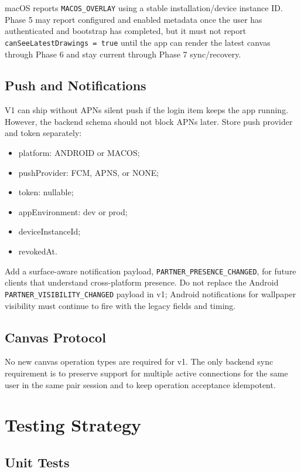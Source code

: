 \documentclass[11pt]{article}
\begin{document}
macOS reports \texttt{MACOS\_OVERLAY} using a stable installation/device instance ID. Phase 5 may report configured and enabled metadata once the user has authenticated and bootstrap has completed, but it must not report {\footnotesize\texttt{canSeeLatestDrawings = true}} until the app can render the latest canvas through Phase 6 and stay current through Phase 7 sync/recovery.

\subsection{Push and Notifications}

V1 can ship without APNs silent push if the login item keeps the app running. However, the backend schema should not block APNs later. Store push provider and token separately:
\begin{itemize}
  \item platform: ANDROID or MACOS;
  \item pushProvider: FCM, APNS, or NONE;
  \item token: nullable;
  \item appEnvironment: dev or prod;
  \item deviceInstanceId;
  \item revokedAt.
\end{itemize}

Add a surface-aware notification payload, {\footnotesize\texttt{PARTNER\_PRESENCE\_CHANGED}}, for future clients that understand cross-platform presence. Do not replace the Android {\footnotesize\texttt{PARTNER\_VISIBILITY\_CHANGED}} payload in v1; Android notifications for wallpaper visibility must continue to fire with the legacy fields and timing.

\subsection{Canvas Protocol}

No new canvas operation types are required for v1. The only backend sync requirement is to preserve support for multiple active connections for the same user in the same pair session and to keep operation acceptance idempotent.

\section{Testing Strategy}

\subsection{Unit Tests}
\end{document}
